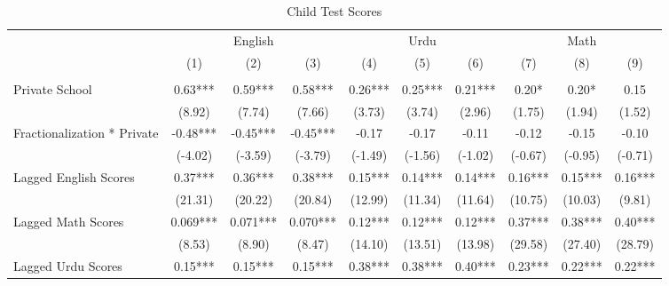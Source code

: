 \begin{sidewaystable}[htbp]\centering
\def\sym#1{\ifmmode^{#1}\else\(^{#1}\)\fi}
\caption{Child Test Scores\label{kids}}
\begin{tabular}{l*{9}{c}}
\toprule
                &\multicolumn{3}{c}{English}           &\multicolumn{3}{c}{Urdu}              &\multicolumn{3}{c}{Math}              \\\cmidrule(lr){2-4}\cmidrule(lr){5-7}\cmidrule(lr){8-10}
                &\multicolumn{1}{c}{(1)}&\multicolumn{1}{c}{(2)}&\multicolumn{1}{c}{(3)}&\multicolumn{1}{c}{(4)}&\multicolumn{1}{c}{(5)}&\multicolumn{1}{c}{(6)}&\multicolumn{1}{c}{(7)}&\multicolumn{1}{c}{(8)}&\multicolumn{1}{c}{(9)}\\
                &\multicolumn{1}{c}{}&\multicolumn{1}{c}{}&\multicolumn{1}{c}{}&\multicolumn{1}{c}{}&\multicolumn{1}{c}{}&\multicolumn{1}{c}{}&\multicolumn{1}{c}{}&\multicolumn{1}{c}{}&\multicolumn{1}{c}{}\\
\midrule
Private School  &     0.63***&     0.59***&     0.58***&     0.26***&     0.25***&     0.21***&     0.20*  &     0.20*  &     0.15   \\
                &   (8.92)   &   (7.74)   &   (7.66)   &   (3.73)   &   (3.74)   &   (2.96)   &   (1.75)   &   (1.94)   &   (1.52)   \\
Fractionalization * Private&    -0.48***&    -0.45***&    -0.45***&    -0.17   &    -0.17   &    -0.11   &    -0.12   &    -0.15   &    -0.10   \\
                &  (-4.02)   &  (-3.59)   &  (-3.79)   &  (-1.49)   &  (-1.56)   &  (-1.02)   &  (-0.67)   &  (-0.95)   &  (-0.71)   \\
Lagged English Scores&     0.37***&     0.36***&     0.38***&     0.15***&     0.14***&     0.14***&     0.16***&     0.15***&     0.16***\\
                &  (21.31)   &  (20.22)   &  (20.84)   &  (12.99)   &  (11.34)   &  (11.64)   &  (10.75)   &  (10.03)   &   (9.81)   \\
Lagged Math Scores&    0.069***&    0.071***&    0.070***&     0.12***&     0.12***&     0.12***&     0.37***&     0.38***&     0.40***\\
                &   (8.53)   &   (8.90)   &   (8.47)   &  (14.10)   &  (13.51)   &  (13.98)   &  (29.58)   &  (27.40)   &  (28.79)   \\
Lagged Urdu Scores&     0.15***&     0.15***&     0.15***&     0.38***&     0.38***&     0.40***&     0.23***&     0.22***&     0.22***\\

\end{tabular}
\end{sidewaystable}
